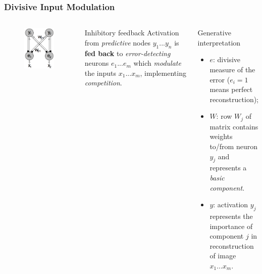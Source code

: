 \documentclass{beamer}
\begin{document}
			\begin{frame}
				\frametitle{Divisive Input Modulation}  
				\begin{columns}[c]
						\begin{figure}[h]
							\centering
							\includegraphics[width=\textwidth]{dim}
						\end{figure}
					    \begin{block}{Inhibitory feedback}
					    	Activation from \emph{predictive} nodes $y_1 ... y_n$ is \textbf{fed back} to \emph{error-detecting} neurons $e_1 ... e_m$ which \emph{modulate} the inputs $x_1 ... x_m$, implementing \emph{competition}.
					    \end{block}
					    \begin{block}{Generative interpretation}
					    	\small{\begin{itemize}
					    		\item $e$: divisive measure of the error ($e_i = 1$ means perfect reconstruction);
					    		\item $W$: row $W_j$ of matrix contains weights to/from neuron $y_j$ and represents a \emph{basic component}.
					    		\item $y$: activation $y_j$ represents the importance of component $j$ in reconstruction of image $x_1 ... x_m$.
					    	\end{itemize}}
					    \end{block}
				\end{columns}
			\end{frame}
\end{document}
